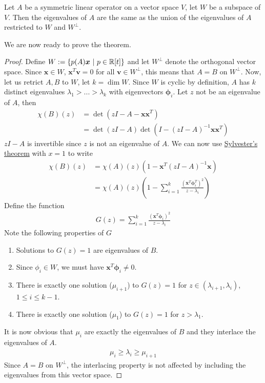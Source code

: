 \documentclass{math}
\renewcommand{\vec}[1]{\boldsymbol{#1}}
\begin{document}
\begin{lemma}
    Let $A$ be a symmetric linear operator on a vector space $V$, let $W$ be a subspace of $V$.
    Then the eigenvalues of $A$ are the same as the union of the eigenvalues of $A$ restricted to $W$ and $W^\perp$.
\end{lemma}

We are now ready to prove the theorem.

\begin{proof}
    Define $W := \setc{p(A)\vec{x}}{p \in \mathbb{R}[t]}$ and let $W^\perp$ denote the orthogonal vector space.
    Since $\vec{x} \in W$, $\vec{x}^T \vec{v} = 0$ for all $\vec{v} \in W^\perp$, this means that $A = B$ on $W^\perp$.
    Now, let us retrict $A, B$ to $W$, let $k = \dim W$.
    Since $W$ is cyclic by definition, $A$ has $k$ distinct eigenvalues $\lambda_1 > ... > \lambda_k$ with eigenvectors $\vec{\phi}_i$.
    Let $z$ not be an eigenvalue of $A$, then
    \begin{align*}
        \chi(B)(z) & = \det(zI - A - \vec{x}\vec{x}^T)                      \\
                   & = \det(zI - A) \det(I - (zI - A)^{-1}\vec{x}\vec{x}^T)
    \end{align*}
    $zI-A$ is invertible since $z$ is not an eigenvalue of $A$. We can now use \hyperref[lemma:sylvester]{Sylvester's theorem} with $x = 1$ to write
    \begin{align*}
        \chi(B)(z) & = \chi(A)(z)(1 - \vec{x}^T (zI - A)^{-1} \vec{x})                                              \\
                   & = \chi(A)(z)\left(1 - \sum_{i = 1}^k \frac{(\vec{x}^T \vec{\phi}_i^T)^2}{z - \lambda_i}\right)
    \end{align*}
    Define the function
    \begin{align*}
        G(z) = \sum_{i=1}^k \frac{(\vec{x}^T \vec{\phi}_i)^2}{z - \lambda_i}
    \end{align*}
    Note the following properties of $G$
    \begin{enumerate}
        \item Solutions to $G(z) = 1$ are eigenvalues of $B$.
        \item Since $\phi_i \in W$, we must have $\vec{x}^T \vec{\phi}_i \neq 0$.
        \item There is exactly one solution ($\mu_{i + 1}$) to $G(z) = 1$ for $z \in (\lambda_{i + 1}, \lambda_{i})$, $1 \leq i \leq k - 1$.
        \item There is exactly one solution ($\mu_1$) to $G(z) = 1$ for $z > \lambda_1$.
    \end{enumerate}
    It is now obvious that $\mu_i$ are exactly the eigenvalues of $B$ and they interlace the eigenvalues of $A$.
    \begin{align*}
        \mu_i \geq \lambda_i \geq \mu_{i + 1}
    \end{align*}
    Since $A=B$ on $W^\perp$, the interlacing property is not affected by including the eigenvalues from this vector space.
\end{proof}
\end{document}

